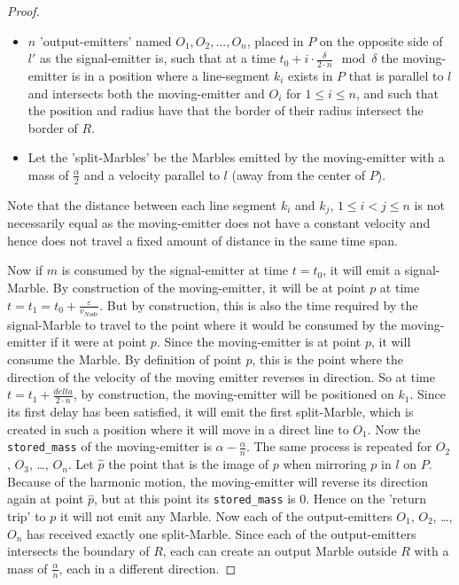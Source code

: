 \begin{proof}
\begin{itemize}
        \item $n$ 'output-emitters' named $O_1, O_2, \dots, O_n$, placed in $P$ on the opposite side of $l'$ as the signal-emitter is, such that at a time $t_0 + i \cdot \frac{\delta}{2 \cdot n} \mod \delta$ the moving-emitter is in a position where a line-segment $k_i$ exists in $P$ that is parallel to $l$ and intersects both the moving-emitter and $O_i$ for $1 \leq i \leq n$, and such that the position and radius have that the border of their radius intersect the border of $R$. 
        \item Let the 'split-Marbles' be the Marbles emitted by the moving-emitter with a mass of $\frac{\alpha}{2}$ and a velocity parallel to $l$ (away from the center of $P$).
    \end{itemize}
    Note that the distance between each line segment $k_i$ and $k_j$, $1 \leq i < j \leq n$ is not necessarily equal as the moving-emitter does not have a constant velocity and hence does not travel a fixed amount of distance in the same time span.
    
    Now if $m$ is consumed by the signal-emitter at time $t = t_0$, it will emit a signal-Marble. By construction of the moving-emitter, it will be at point $p$ at time $t = t_1 = t_0 + \frac{\varepsilon}{v_{Node}}$. But by construction, this is also the time required by the signal-Marble to travel to the point where it would be consumed by the moving-emitter if it were at point $p$. Since the moving-emitter is at point $p$, it will consume the Marble. By definition of point $p$, this is the point where the direction of the velocity of the moving emitter reverses in direction. So at time $t = t_1 + \frac{delta}{2\cdot n}$, by construction, the moving-emitter will be positioned on $k_1$. Since its first delay has been satisfied, it will emit the first split-Marble, which is created in such a position where it will move in a direct line to $O_1$. Now the \texttt{stored\_mass} of the moving-emitter is $\alpha - \frac{\alpha}{n}$. The same process is repeated for $O_2$, $O_3$, \dots, $O_n$. Let $\hat{p}$ the point that is the image of $p$ when mirroring $p$ in $l$ on $P$. Because of the harmonic motion, the moving-emitter will reverse its direction again at point $\hat{p}$, but at this point its \texttt{stored\_mass} is 0. Hence on the 'return trip' to $p$ it will not emit any Marble. Now each of the output-emitters $O_1$, $O_2$, \dots, $O_n$ has received exactly one split-Marble. Since each of the output-emitters intersects the boundary of $R$, each can create an output Marble outside $R$ with a mass of $\frac{\alpha}{n}$, each in a different direction.
    

\end{proof}
